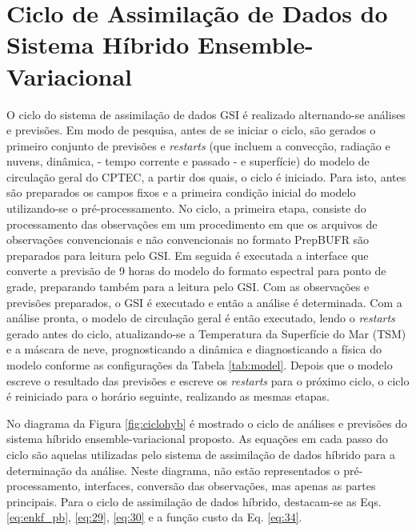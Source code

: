 \section{Ciclo de Assimilação de Dados do Sistema Híbrido Ensemble-Variacional}

O ciclo do sistema de assimilação de dados GSI é realizado alternando-se análises e previsões. Em modo de pesquisa, antes de se iniciar o ciclo, são gerados o primeiro conjunto de previsões e \textit{restarts} (que incluem a convecção, radiação e nuvens, dinâmica, - tempo corrente e passado - e superfície) do modelo de circulação geral do CPTEC, a partir dos quais, o ciclo é iniciado. Para isto, antes são preparados os campos fixos e a primeira condição inicial do modelo utilizando-se o pré-processamento. No ciclo, a primeira etapa, consiste do processamento das observações em um procedimento em que os arquivos de observações convencionais e não convencionais no formato PrepBUFR são preparados para leitura pelo GSI. Em seguida é executada a interface que converte a previsão de 9 horas do modelo do formato espectral para ponto de grade, preparando também para a leitura pelo GSI. Com as observações e previsões preparados, o GSI é executado e então a análise é determinada. Com a análise pronta, o modelo de circulação geral é então executado, lendo o \textit{restarts} gerado antes do ciclo, atualizando-se a Temperatura da Superfície do Mar (TSM) e a máscara de neve, prognosticando a dinâmica e diagnosticando a física do modelo conforme as configurações da Tabela \ref{tab:model}. Depois que o modelo escreve o resultado das previsões e escreve os \textit{restarts} para o próximo ciclo, o ciclo é reiniciado para o horário seguinte, realizando as mesmas etapas.

No diagrama da Figura \ref{fig:ciclohyb} é mostrado o ciclo de análises e previsões do sistema híbrido ensemble-variacional proposto. As equações em cada passo do ciclo são aquelas utilizadas pelo sistema de assimilação de dados híbrido para a determinação da análise. Neste diagrama, não estão representados o pré-processamento, interfaces, conversão das observações, mas apenas as partes principais. Para o ciclo de assimilação de dados híbrido, destacam-se as Eqs. \ref{eq:enkf_pb}, \ref{eq:29}, \ref{eq:30} e a função custo da Eq. \ref{eq:34}.


